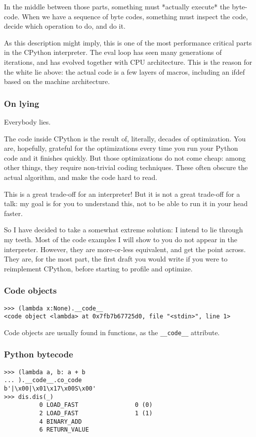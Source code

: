 In the middle between those parts,
something must
*actually execute*
the byte-code.
When we have a sequence of byte codes,
something must inspect the code,
decide which operation to do,
and do it.

As this description might imply,
this is one of the most performance critical parts
in the CPython interpreter.
The eval loop has seen many generations of iterations,
and has evolved together with CPU architecture.
This is the reason for the white lie above:
the actual code is a few layers of macros,
including an ifdef based on the machine architecture.

\begin{frame}[fragile]
\frametitle{On lying}

Everybody lies.
\end{frame}

The code inside CPython is the result of,
literally,
decades of optimization.
You are,
hopefully,
grateful for the optimizations every time you run your Python code
and it finishes quickly.
But those optimizations do not come cheap:
among other things,
they require non-trivial coding techniques.
These often obscure the actual algorithm,
and make the code hard to read.

This is a great trade-off for an interpreter!
But it is not a great trade-off for a talk:
my goal is for you to understand this,
not to be able to run it in your head faster.

So I have decided to take a somewhat extreme solution:
I intend to lie through my teeth.
Most of the code examples I will show to you do not
appear in the interpreter.
However,
they are more-or-less equivalent,
and get the point across.
They are,
for the most part,
the first draft you would write if you were to reimplement CPython,
before starting to profile and optimize.


\begin{frame}[fragile]
\frametitle{Code objects}

\begin{lstlisting}
>>> (lambda x:None).__code__
<code object <lambda> at 0x7fb7b67725d0, file "<stdin>", line 1>
\end{lstlisting}

\end{frame}

Code objects are usually found in functions,
as the \verb|__code__| attribute.

\begin{frame}
\frametitle{Python bytecode}

\begin{lstlisting}
>>> (lambda a, b: a + b
... ).__code__.co_code
b'|\x00|\x01\x17\x00S\x00'
>>> dis.dis(_)
          0 LOAD_FAST                0 (0)
          2 LOAD_FAST                1 (1)
          4 BINARY_ADD
          6 RETURN_VALUE
\end{lstlisting}

\end{frame}

